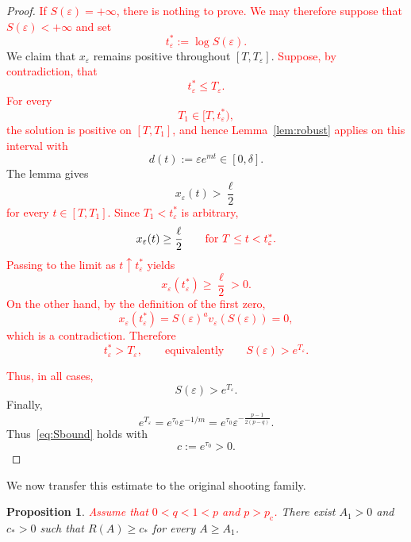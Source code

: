\documentclass[11pt]{article}
\newcommand{\pc}{p_{\mathrm c}}
\newtheorem{proposition}[theorem]{Proposition}
\theoremstyle{definition}
\begin{document}
\begin{proof}
\textcolor{red}{If $S(\varepsilon)=+\infty$, there is nothing to
prove. We may therefore suppose that $S(\varepsilon)<+\infty$ and
set
\[
t_\varepsilon^*:=\log S(\varepsilon).
\]}
We claim that $x_\varepsilon$ remains positive throughout
$[T,T_\varepsilon]$.
\textcolor{red}{Suppose, by contradiction, that
\[
t_\varepsilon^*\leq T_\varepsilon.
\]
For every
\[
T_1\in[T,t_\varepsilon^*),
\]
the solution is positive on $[T,T_1]$, and hence
Lemma~\ref{lem:robust} applies on this interval with}
\[
d(t):=\varepsilon e^{mt}\in[0,\delta].
\]
The lemma gives
\[
x_\varepsilon(t)>\frac{\ell}{2}
\]
\textcolor{red}{for every $t\in[T,T_1]$. Since $T_1<t_\varepsilon^*$
is arbitrary,}
\[
x_\varepsilon(t)\geq\frac{\ell}{2}
\qquad
\textcolor{red}{\text{for }T\leq t<t_\varepsilon^*.}
\]
\textcolor{red}{Passing to the limit as
$t\uparrow t_\varepsilon^*$ yields
\[
x_\varepsilon(t_\varepsilon^*)
\geq\frac{\ell}{2}>0.
\]
On the other hand, by the definition of the first zero,
\[
x_\varepsilon(t_\varepsilon^*)
=
S(\varepsilon)^a
v_\varepsilon(S(\varepsilon))
=0,
\]
which is a contradiction. Therefore
\[
t_\varepsilon^*>T_\varepsilon,
\qquad\text{equivalently}\qquad
S(\varepsilon)>e^{T_\varepsilon}.
\]}

\textcolor{red}{Thus, in all cases,}
\[
S(\varepsilon)>e^{T_\varepsilon}.
\]
Finally,
\[
e^{T_\varepsilon}
=
e^{\tau_0}
\varepsilon^{-1/m}
=
e^{\tau_0}
\varepsilon^{-\frac{p-1}{2(p-q)}}.
\]
Thus~\eqref{eq:Sbound} holds with
\[
c:=e^{\tau_0}>0.
\]
\end{proof}

We now transfer this estimate to the original shooting family.

\begin{proposition}
\label{prop:largeA}
\textcolor{red}{Assume that $0<q<1<p$ and $p>\pc$.}
There exist $A_1>0$ and $c_*>0$ such that
\(
R(A)\geq c_*
\)
for every \(A\geq A_1\).
\end{proposition}
\end{document}
